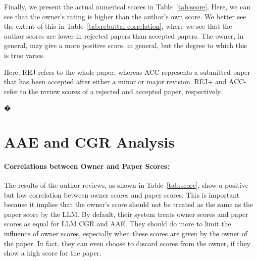 \documentclass{article} %
\begin{document}
Finally, we present the actual numerical scores in Table~\ref{tab:score}. Here, we can see that the owner's rating is higher than the author's own score. We better see the extent of this in Table~\ref{tab:rebuttal-correlation}, where we see that the author scores are lower in rejected papers than accepted papers. The owner, in general, may give a more positive score, in general, but the degree to which this is true varies.

Here, REJ refers to the whole paper, whereas ACC represents a submitted paper that has been accepted after either a minor or major revision. REJ+ and ACC- refer to the review scores of a rejected and accepted paper, respectively.

\begin{table}[t]
\centering
\caption{The owner often gives a higher score than the author, especially when the authors are required to make a major revision.}
\label{tab:score}
\end{table}


�
\section{AAE and CGR Analysis}

\paragraph{Correlations between Owner and Paper Scores:}
The results of the author reviews, as shown in Table~\ref{tab:score}, show a positive but low correlation between owner scores and paper scores. This is important because it implies that the owner's score should not be treated as the same as the paper score by the LLM. By default, their system treats owner scores and paper scores as equal for LLM CGR and AAE. They should do more to limit the influence of owner scores, especially when these scores are given by the owner of the paper. In fact, they can even choose to discard scores from the owner, if they show a high score for the paper. 
\end{document}
